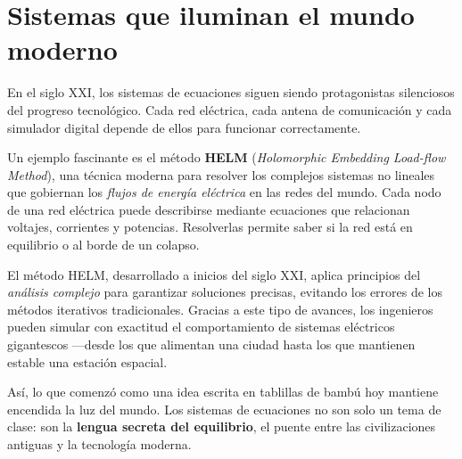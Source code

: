 \section*{Sistemas que iluminan el mundo moderno}

\begin{reseñaplana}
En el siglo XXI, los sistemas de ecuaciones siguen siendo protagonistas silenciosos del progreso tecnológico.  
Cada red eléctrica, cada antena de comunicación y cada simulador digital depende de ellos para funcionar correctamente.

Un ejemplo fascinante es el método \textbf{HELM} (\textit{Holomorphic Embedding Load-flow Method}), una técnica 
moderna para resolver los complejos sistemas no lineales que gobiernan los \textit{flujos de energía eléctrica} en las redes del mundo.  
Cada nodo de una red eléctrica puede describirse mediante ecuaciones que relacionan voltajes, corrientes y potencias.  
Resolverlas permite saber si la red está en equilibrio o al borde de un colapso.

El método HELM, desarrollado a inicios del siglo XXI, aplica principios del \textit{análisis complejo} para garantizar 
soluciones precisas, evitando los errores de los métodos iterativos tradicionales. Gracias a este tipo de avances, 
los ingenieros pueden simular con exactitud el comportamiento de sistemas eléctricos gigantescos —desde los que 
alimentan una ciudad hasta los que mantienen estable una estación espacial.

Así, lo que comenzó como una idea escrita en tablillas de bambú hoy mantiene encendida la luz del mundo.  
Los sistemas de ecuaciones no son solo un tema de clase: son la \textbf{lengua secreta del equilibrio}, el puente 
entre las civilizaciones antiguas y la tecnología moderna.
\end{reseñaplana}

